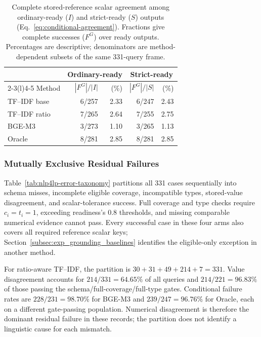 \documentclass[pdflatex,iicol,sn-basic,Numbered]{sn-jnl}
\begin{document}
\begin{table}[t]\centering\small
\caption{Complete stored-reference scalar agreement among ordinary-ready ($I$) and strict-ready ($S$) outputs (Eq.~\eqref{eq:conditional-agreement}). Fractions give complete successes ($F^G$) over ready outputs. Percentages are descriptive; denominators are method-dependent subsets of the same 331-query frame.}
\label{tab:ready-conditioned}
\setlength{\tabcolsep}{2.2pt}
\renewcommand{\arraystretch}{1.18}
\begin{tabular}{@{}lrrrr@{}}\toprule
& \multicolumn{2}{c}{Ordinary-ready} & \multicolumn{2}{c}{Strict-ready} \\
\cmidrule(lr){2-3}\cmidrule(l){4-5}
Method & $|F^G|/|I|$ & (\%) & $|F^G|/|S|$ & (\%)\\\midrule
TF--IDF base & 6/257 & 2.33 & 6/247 & 2.43 \\
TF--IDF ratio & 7/265 & 2.64 & 7/255 & 2.75 \\
BGE-M3 & 3/273 & 1.10 & 3/265 & 1.13 \\
Oracle & 8/281 & 2.85 & 8/281 & 2.85 \\
\bottomrule\end{tabular}
\end{table}

\subsubsection{Mutually Exclusive Residual Failures}
\label{subsec:exp_error}
Table~\ref{tab:nlp4lp-error-taxonomy} partitions all 331 cases sequentially into schema misses, incomplete eligible coverage, incompatible types, stored-value disagreement, and scalar-tolerance success. Full coverage and type checks require $c_i=t_i=1$, exceeding readiness's 0.8 thresholds, and missing comparable numerical evidence cannot pass. Every successful case in these four arms also covers all required reference scalar keys; Section~\ref{subsec:exp_grounding_baselines} identifies the eligible-only exception in another method.

For ratio-aware TF--IDF, the partition is $30+31+49+214+7=331$. Value disagreement accounts for $214/331=64.65\%$ of all queries and $214/221=96.83\%$ of those passing the schema/full-coverage/full-type gates. Conditional failure rates are $228/231=98.70\%$ for BGE-M3 and $239/247=96.76\%$ for Oracle, each on a different gate-passing population. Numerical disagreement is therefore the dominant residual failure in these records; the partition does not identify a linguistic cause for each mismatch.
\end{document}
